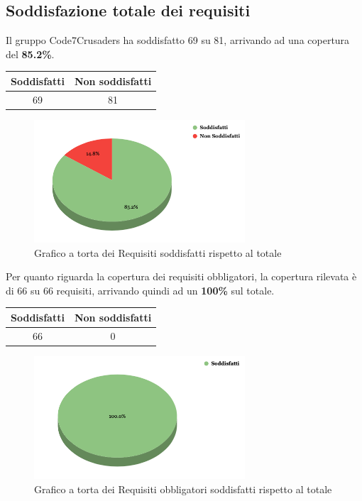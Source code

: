 \subsection{Soddisfazione totale dei requisiti}
Il gruppo Code7Crusaders ha soddisfatto 69 su 81, arrivando ad una copertura del \textbf{85.2\%}.
\begin{center}
\begin{tabular}{|c|c|}
\hline
\textbf{Soddisfatti} & \textbf{Non soddisfatti} \\
\hline
69 & 81 \\
\hline
\end{tabular}
\end{center}
\begin{figure}[H]
    \centering
    \includegraphics[width=0.7\textwidth]{img/RequisitiTotali.png}
    \caption{Grafico a torta dei Requisiti soddisfatti rispetto al totale}
\end{figure}
\newpage
Per quanto riguarda la copertura dei requisiti obbligatori, la copertura rilevata è di 66 su 66 requisiti, arrivando quindi ad un \textbf{100\%} sul totale.
\begin{center}
\begin{tabular}{|c|c|}
\hline
\textbf{Soddisfatti} & \textbf{Non soddisfatti} \\
\hline
66 & 0 \\
\hline
\end{tabular}
\end{center}
\begin{figure}[H]
    \centering
    \includegraphics[width=0.7\textwidth]{img/RequisitiObbligatori.png}
    \caption{Grafico a torta dei Requisiti obbligatori soddisfatti rispetto al totale}
\end{figure}

